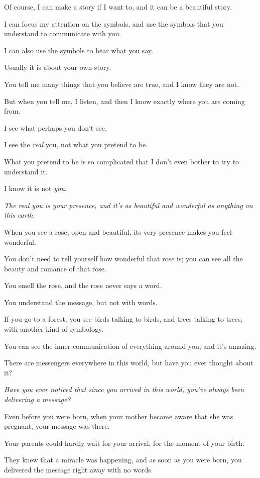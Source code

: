 \documentclass{article}
\numberwithin{equation}{section}
\begin{document}
Of course, I can make a story if I want to, and it can be a beautiful story.

I can focus my attention on the symbols, and use the symbols that you understand to communicate with you.

I can also use the symbols to hear what you say.

Usually it is about your own story.

You tell me many things that you believe are true, and I know they are not.

But when you tell me, I listen, and then I know exactly where you are coming from.

I see what perhaps you don't see.

I see the \textit{real} you, not what you pretend to be.

What you pretend to be is so complicated that I don't even bother to try to understand it.

I know it is not \textit{you}.

\textit{The real you is your presence, and it's as beautiful and wonderful as anything on this earth}.

%
When you see a rose, open and beautiful, its very presence makes you feel wonderful.

You don't need to tell yourself how wonderful that rose is; you can see all the beauty and romance of that rose.

You smell the rose, and the rose never says a word.

You understand the message, but not with words.

If you go to a forest, you see birds talking to birds, and trees talking to trees, with another kind of symbology.

You can see the inner communication of everything around you, and it's amazing.

There are messengers everywhere in this world, but have you ever thought about it?

\textit{Have you ever noticed that since you arrived in this world, you've always been delivering a message?}

Even before you were born, when your mother became aware that she was pregnant, your message was there.

Your parents could hardly wait for your arrival, for the moment of your birth.

They knew that a miracle was happening, and as soon as you were born, you delivered the message right away with no words.
\end{document}
